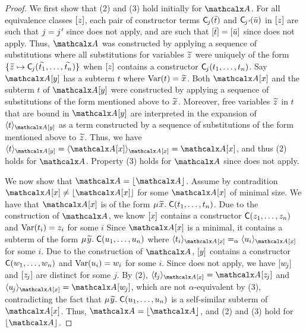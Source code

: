 \begin{rep}
\begin{proof}
We first show that (2) and (3) hold initially for $\Val$.
For all equivalence classes $[z]$,
each pair of constructor terms $\textsf{C}_{\kern-0.083333em j}( \bar t )$ and $\const{C}_{\negvthinspace\jPrime}( \vec u )$ in $[z]$
are such that $j = \jPrime$ since  does not apply, %
and are such that $[ \bar t ] = [ \bar u ]$ since  does not apply. %
Thus,
$\Val$ was constructed by applying a sequence of substitutions
where all substitutions for variables ${\Varec{z}}$
were uniquely of the form $\{ {\Varec{z}} \mapsto \const{C}_{\negvthinspace j}( {\Varec{t_1}}, \ldots, {\Varec{t_n}} ) \}$
when $[z]$ contains a constructor $\textsf{C}_{\kern-0.083333em j}( t_1, \ldots, t_n )$.
Say $\Val \ec{y}$ has a subterm $t$ where $\muvar(t) = {\Varec{x}}$.
Both $\Val \ec{x}$ and the subterm $t$ of $\Val \ec{y}$ were
constructed by applying a sequence of substitutions of the form mentioned above to ${\Varec{x}}$.
Moreover, free variables ${\Varec{z}}$ in $t$ that are bound in $\Val \ec{y}$ are interpreted in
the expansion of $\expand{\Val \ec{y}}{ t }$ as a term
constructed by a sequence of substitutions of the form mentioned above to ${\Varec{z}}$. %
Thus, we have
$\expand{\Val \ec{y}}{ t } = \expand{\Val \ec{x}}{ \Val \ec{x} } = \Val \ec{x}$, and thus (2) holds for $\Val$.
Property (3) holds for $\Val$ since  does not apply.

We now show that $\Val = \nf{\Val}$.
Assume by contradition $\Val \ec{x} \neq \nf{\Val \ec{x}}$ for some $\Val \ec{x}$ of minimal size.
We have that $\Val \ec{x}$ is of the form $\MU {\Varec{x}}.\; \const{C}( t_1, \ldots, t_n )$.
Due to the construction of $\Val$,
we know $[x]$ contains a constructor $\textsf{C}( z_1, \ldots, z_n )$ and $\mathrm{Var}( t_i ) = z_i$ for some $i$ %
Since $\Val \ec{x}$ is a minimal, it
contains a subterm of the form $\MU {\Varec{y}}.\; \const{C}( u_1, \ldots, u_n )$
where $\expand{\Val \ec{x}}{ t_i } \aequiv \expand{\Val \ec{x} }{ u_i }$ for some $i$. %
Due to the construction of $\Val$, $[y]$ contains a constructor $\textsf{C}( w_1, \ldots, w_n )$ and $\mathrm{Var}( u_i ) = w_i$ for some $i$. %
Since  does not apply, %
we have $[w_{\kern-0.083333em j}]$ and $[z_{\kern-0.083333em j}]$ are distinct for some $j$.
By (2), $\expand{\Val \ec{x}}{ t_{\negvthinspace j} } = \Val \ec{z_{\negvthinspace j}}$
and $\expand{\Val \ec{x}}{ u_{\negvthinspace j} } = \Val \ec{w_{\negvthinspace j}}$,
which are not $\alpha$-equivalent by (3), contradicting the fact that $\MU {\Varec{y}}.\; \const{C}( u_1, \ldots, u_n )$ is a self-similar subterm of $\Val \ec{x}$.
Thus, $\Val = \nf{\Val}$, and (2) and (3) hold for $\nf{\Val}$.


\end{proof}
\end{rep}

